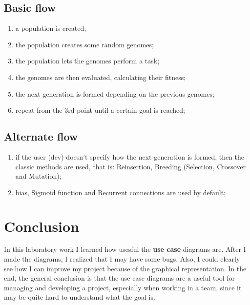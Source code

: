 \documentclass{article}
\begin{document}
		\newpage
		\subsection{Basic flow}
			\begin{enumerate}
				\item a population is created;
				\item the population creates some random genomes;
				\item the population lets the genomes perform a task;
				\item the genomes are then evaluated, calculating their fitness;
				\item the next generation is formed depending on the previous genomes;
				\item repeat from the 3rd point until a certain goal is reached;
			\end{enumerate}
		\subsection{Alternate flow}
			\begin{enumerate}
				\item if the user (dev) doesn't specify how the next generation is formed, then the classic methods are used, that is: Reinsertion, Breeding (Selection, Crossover and Mutation);
				\item bias, Sigmoid function and Recurrent connections are used by default;
			\end{enumerate}

	\newpage
	\section{Conclusion}
		In this laboratory work I learned how usesful the \textbf{use case} diagrams are. After I made the diagrams, I realized that I may have some bugs. Also, I could clearly see how I can improve my project because of the graphical representation. In the end, the general conclusion is that the use case diagrams are a useful tool for managing and developing a project, especially when working in a team, since it may be quite hard to understand what the goal is.
\end{document}
